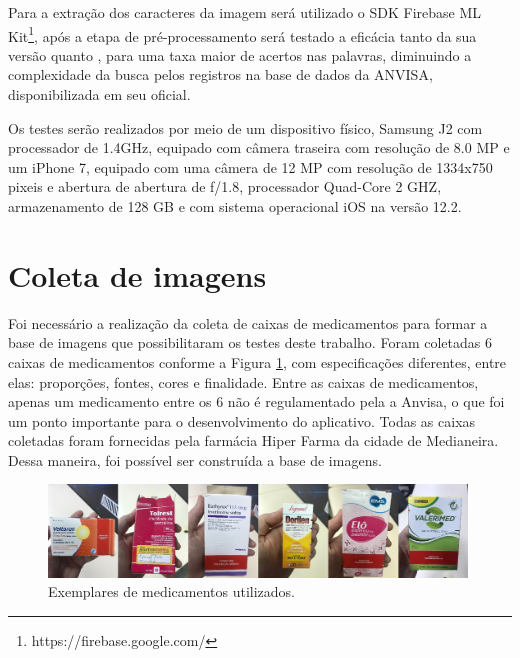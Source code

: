 Para a extração dos caracteres da imagem será utilizado o SDK Firebase ML Kit\footnote{https://firebase.google.com/}, após a etapa de pré-processamento será testado a eficácia tanto da sua versão  quanto , para uma taxa maior de acertos nas palavras, diminuindo a complexidade da busca pelos registros na base de dados da ANVISA, disponibilizada em seu  oficial.

Os testes serão realizados por meio de um dispositivo físico, Samsung J2 com processador de 1.4GHz, equipado com câmera traseira com resolução de 8.0 MP  e um iPhone 7, equipado com uma câmera de 12 MP com resolução de 1334x750 pixeis e abertura de abertura de ƒ/1.8, processador Quad-Core 2 GHZ, armazenamento de 128 GB e com sistema operacional iOS na versão 12.2.





\section{Coleta de imagens}

Foi necessário a realização da coleta de caixas de medicamentos para formar a base de imagens que possibilitaram os testes deste trabalho. Foram coletadas 6 caixas de medicamentos conforme a Figura \ref{exemplares}, com especificações diferentes, entre elas: proporções, fontes, cores e finalidade. Entre as caixas de medicamentos, apenas um medicamento entre os 6 não é regulamentado pela a Anvisa, o que foi um ponto importante para o desenvolvimento do aplicativo. Todas as caixas coletadas foram fornecidas pela farmácia Hiper Farma da cidade de Medianeira. Dessa maneira, foi possível ser construída a base de imagens.

 \begin{figure}[h!]
	\centering
	\includegraphics[width=0.99\textwidth]{Imagens/exemplares.jpg} 
	\caption[Exemplares de medicamentos utilizados.]{Exemplares de medicamentos utilizados.}
	\label{exemplares}
\end{figure}


